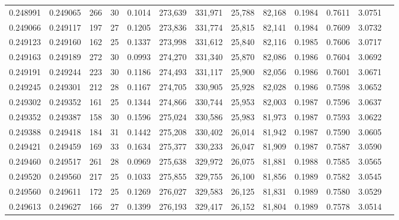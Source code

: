 \begin{tabular}{rrrrrrrrrrrrr}
0.248991 & 0.249065 &   266 &  30 &                                     0.1014 & 273,639 & 331,971 &  25,788 &  82,168 & 0.1984 & 0.7611 & 3.0751 \\
0.249066 & 0.249117 &   197 &  27 &                                     0.1205 & 273,836 & 331,774 &  25,815 &  82,141 & 0.1984 & 0.7609 & 3.0732 \\
0.249123 & 0.249160 &   162 &  25 &                                     0.1337 & 273,998 & 331,612 &  25,840 &  82,116 & 0.1985 & 0.7606 & 3.0717 \\
0.249163 & 0.249189 &   272 &  30 &                                     0.0993 & 274,270 & 331,340 &  25,870 &  82,086 & 0.1986 & 0.7604 & 3.0692 \\
0.249191 & 0.249244 &   223 &  30 &                                     0.1186 & 274,493 & 331,117 &  25,900 &  82,056 & 0.1986 & 0.7601 & 3.0671 \\
0.249245 & 0.249301 &   212 &  28 &                                     0.1167 & 274,705 & 330,905 &  25,928 &  82,028 & 0.1986 & 0.7598 & 3.0652 \\
0.249302 & 0.249352 &   161 &  25 &                                     0.1344 & 274,866 & 330,744 &  25,953 &  82,003 & 0.1987 & 0.7596 & 3.0637 \\
0.249352 & 0.249387 &   158 &  30 &                                     0.1596 & 275,024 & 330,586 &  25,983 &  81,973 & 0.1987 & 0.7593 & 3.0622 \\
0.249388 & 0.249418 &   184 &  31 &                                     0.1442 & 275,208 & 330,402 &  26,014 &  81,942 & 0.1987 & 0.7590 & 3.0605 \\
0.249421 & 0.249459 &   169 &  33 &                                     0.1634 & 275,377 & 330,233 &  26,047 &  81,909 & 0.1987 & 0.7587 & 3.0590 \\
0.249460 & 0.249517 &   261 &  28 &                                     0.0969 & 275,638 & 329,972 &  26,075 &  81,881 & 0.1988 & 0.7585 & 3.0565 \\
0.249520 & 0.249560 &   217 &  25 &                                     0.1033 & 275,855 & 329,755 &  26,100 &  81,856 & 0.1989 & 0.7582 & 3.0545 \\
0.249560 & 0.249611 &   172 &  25 &                                     0.1269 & 276,027 & 329,583 &  26,125 &  81,831 & 0.1989 & 0.7580 & 3.0529 \\
0.249613 & 0.249627 &   166 &  27 &                                     0.1399 & 276,193 & 329,417 &  26,152 &  81,804 & 0.1989 & 0.7578 & 3.0514 \\

\end{tabular}
